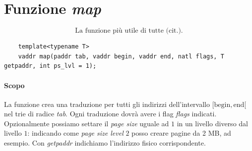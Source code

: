\section{Funzione \emph{map}}
\[\boxed{\text{La funzione più utile di tutte (cit.).}}\]
\begin{verbatim}
	template<typename T>
	vaddr map(paddr tab, vaddr begin, vaddr end, natl flags, T getpaddr, int ps_lvl = 1);
\end{verbatim}
\paragraph{Scopo} La funzione crea una traduzione per tutti gli indirizzi dell'intervallo $[\text{begin}, \text{end}[$ nel  trie di radice \emph{tab}. Ogni traduzione dovrà avere i flag \emph{flags} indicati. Opzionalmente possiamo settare il \emph{page size} uguale ad $1$ in un livello diverso dal livello $1$: indicando come \emph{page size level} $2$ posso creare pagine da 2 MB, ad esempio. Con \emph{getpaddr} indichiamo l'indirizzo fisico corrispondente.
